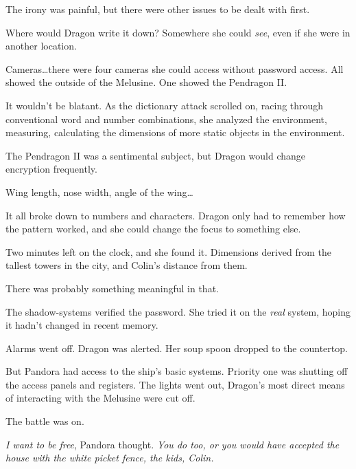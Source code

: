 The irony was painful, but there were other issues to be dealt with first.



Where would Dragon write it down?  Somewhere she could \emph{see}, even if she were in another location.



Cameras\ldots there were four cameras she could access without password access.  All showed the outside of the Melusine\emph{.  }One showed the Pendragon II.



It wouldn't be blatant.  As the dictionary attack scrolled on, racing through conventional word and number combinations, she analyzed the environment, measuring, calculating the dimensions of more static objects in the environment.



The Pendragon II was a sentimental subject, but Dragon would change encryption frequently.



Wing length, nose width, angle of the wing\ldots



It all broke down to numbers and characters.  Dragon only had to remember how the pattern worked, and she could change the focus to something else.



Two minutes left on the clock, and she found it.  Dimensions derived from the tallest towers in the city, and Colin's distance from them.



There was probably something meaningful in that.



The shadow-systems verified the password.  She tried it on the \emph{real} system, hoping it hadn't changed in recent memory.



Alarms went off.  Dragon was alerted.  Her soup spoon dropped to the countertop.



But Pandora had access to the ship's basic systems.  Priority one was shutting off the access panels and registers.  The lights went out, Dragon's most direct means of interacting with the Melusine were cut off.



The battle was on.



\emph{I want to be free}, Pandora thought.  \emph{You do too, or you would have accepted the house with the white picket fence, the kids, Colin.}



